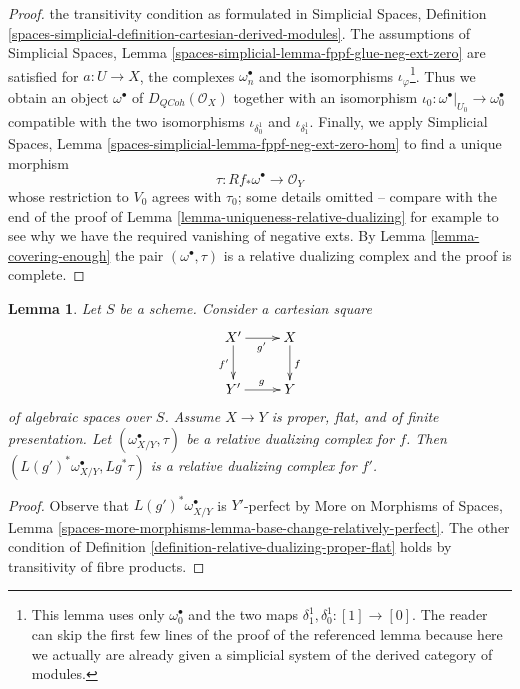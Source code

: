 \documentclass{stacks-project}
\theoremstyle{plain}
\newtheorem{lemma}[subsection]{Lemma}
\theoremstyle{definition}
\theoremstyle{remark}
\numberwithin{equation}{subsection}
\def\QCoh{\mathit{QCoh}}
\begin{document}
\begin{proof}
the transitivity condition as formulated in
Simplicial Spaces, Definition
\ref{spaces-simplicial-definition-cartesian-derived-modules}.
The assumptions of Simplicial Spaces, Lemma
\ref{spaces-simplicial-lemma-fppf-glue-neg-ext-zero}
are satisfied for $a : U \to X$, the complexes $\omega_n^\bullet$
and the isomorphisms $\iota_\varphi$\footnote{This lemma uses only
$\omega_0^\bullet$ and the two maps $\delta_1^1, \delta_0^1 : [1] \to [0]$.
The reader can skip the first few lines of the proof of the
referenced lemma
because here we actually are already given a simplicial system of
the derived category of modules.}.
Thus we obtain an object $\omega^\bullet$ of $D_\QCoh(\mathcal{O}_X)$
together with an isomorphism
$\iota_0 : \omega^\bullet|_{U_0} \to \omega_0^\bullet$
compatible with the two isomorphisms
$\iota_{\delta^1_0}$ and $\iota_{\delta^1_1}$.
Finally, we apply
Simplicial Spaces, Lemma
\ref{spaces-simplicial-lemma-fppf-neg-ext-zero-hom}
to find a unique morphism
$$
\tau : Rf_*\omega^\bullet \longrightarrow \mathcal{O}_Y
$$
whose restriction to $V_0$ agrees with $\tau_0$; some details omitted --
compare with the end of the  proof of
Lemma \ref{lemma-uniqueness-relative-dualizing}
for example to see why we have
the required vanishing of negative exts.
By Lemma \ref{lemma-covering-enough}
the pair $(\omega^\bullet, \tau)$ is a relative dualizing complex
and the proof is complete.
\end{proof}

\begin{lemma}
\label{lemma-base-change-relative-dualizing}
Let $S$ be a scheme. Consider a cartesian square
$$
\xymatrix{
X' \ar[d]_{f'} \ar[r]_{g'} & X \ar[d]^f \\
Y' \ar[r]^g & Y
}
$$
of algebraic spaces over $S$. Assume $X \to Y$ is proper, flat, and
of finite presentation. Let $(\omega_{X/Y}^\bullet, \tau)$ be a
relative dualizing complex for $f$. Then
$(L(g')^*\omega_{X/Y}^\bullet, Lg^*\tau)$ is a relative dualizing
complex for $f'$.
\end{lemma}

\begin{proof}
Observe that $L(g')^*\omega_{X/Y}^\bullet$ is $Y'$-perfect by
More on Morphisms of Spaces, Lemma
\ref{spaces-more-morphisms-lemma-base-change-relatively-perfect}.
The other condition of
Definition \ref{definition-relative-dualizing-proper-flat}
holds by transitivity of fibre products.
\end{proof}
\end{document}
